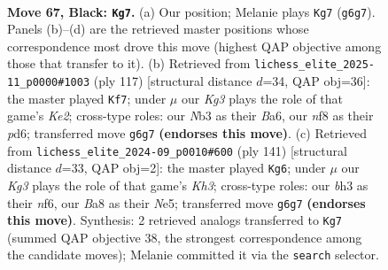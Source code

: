 \documentclass[11pt]{article}
\begin{document}
\clearpage

\begin{figure}[p]\centering
\begin{subfigure}{0.46\textwidth}\centering
\resizebox{\linewidth}{!}{%
\newchessgame
\chessboard[
  setfen={b4N2/P7/6k1/8/1p3P2/1n4PB/4K2P/R7 b - - 3 67},
  showmover=false,
  pgfstyle=straightmove, color=movearrow, markmove={g6-g7}
]}
\caption{}
\end{subfigure}\hfill
\begin{subfigure}{0.46\textwidth}\centering
\resizebox{\linewidth}{!}{%
\newchessgame
\chessboard[
  setfen={8/4k3/b2P4/4pp2/4N2P/5P2/6P1/4K3 b - - 0 59},
  showmover=false,
  pgfstyle=straightmove, color=movearrow, markmove={e7-f7}
]}
\caption{}
\end{subfigure}
\\[4pt]
\begin{subfigure}{0.46\textwidth}\centering
\resizebox{\linewidth}{!}{%
\newchessgame
\chessboard[
  setfen={8/8/5N1k/1PpPn3/2P5/8/K7/6r1 b - - 0 71},
  showmover=false,
  pgfstyle=straightmove, color=movearrow, markmove={h6-g6}
]}
\caption{}
\end{subfigure}\hfill

\caption{\textbf{Move 67, Black: \texttt{Kg7}.} (a) Our position; Melanie plays \texttt{Kg7} (\texttt{g6g7}). Panels (b)--(d) are the retrieved master positions whose correspondence most drove this move (highest QAP objective among those that transfer to it). (b) Retrieved from \texttt{lichess\_elite\_2025-11\_p0000\#1003} (ply 117) [structural distance $d$=34, QAP obj=36]: the master played \texttt{Kf7}; under $\mu$ our \emph{Kg3} plays the role of that game's \emph{Ke2}; cross-type roles: our \emph{N}b3 as their \emph{B}a6, our \emph{n}f8 as their \emph{p}d6; transferred move \texttt{g6g7} \textbf{(endorses this move)}. (c) Retrieved from \texttt{lichess\_elite\_2024-09\_p0010\#600} (ply 141) [structural distance $d$=33, QAP obj=2]: the master played \texttt{Kg6}; under $\mu$ our \emph{Kg3} plays the role of that game's \emph{Kh3}; cross-type roles: our \emph{b}h3 as their \emph{n}f6, our \emph{B}a8 as their \emph{N}e5; transferred move \texttt{g6g7} \textbf{(endorses this move)}. Synthesis: 2 retrieved analogs transferred to \texttt{Kg7} (summed QAP objective 38, the strongest correspondence among the candidate moves); Melanie committed it via the \texttt{search} selector.}
\label{fig:thought-m133}
\end{figure}

\clearpage
\end{document}
